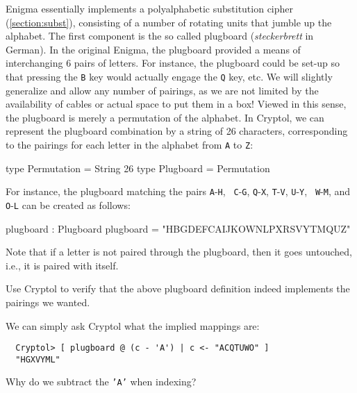 Enigma essentially implements a polyalphabetic substitution cipher
(\autoref{section:subst})\indPolyAlphSubst, consisting of a number
of rotating units that jumble up the alphabet.  The first component is
the so called plugboard ({\em steckerbrett} in
German)\indEnigmaPlugboard. In the original Enigma, the plugboard
provided a means of interchanging 6 pairs of letters. For instance,
the plugboard could be set-up so that pressing the {\tt B} key would
actually engage the {\tt Q} key, etc.  We will slightly generalize and
allow any number of pairings, as we are not limited by the
availability of cables or actual space to put them in a box! Viewed in
this sense, the plugboard is merely a permutation of the alphabet. In
Cryptol, we can represent the plugboard combination by a string of 26
characters, corresponding to the pairings for each letter in the
alphabet from {\tt A} to {\tt Z}:

\begin{code}
  type Permutation = String 26
  type Plugboard = Permutation
\end{code}
For instance, the plugboard matching the pairs {\tt A}-{\tt H}, {\tt
  C}-{\tt G}, {\tt Q}-{\tt X}, {\tt T}-{\tt V}, {\tt U}-{\tt Y}, {\tt
  W}-{\tt M}, and {\tt O}-{\tt L} can be created as follows:
\begin{code}
  plugboard : Plugboard
  plugboard = "HBGDEFCAIJKOWNLPXRSVYTMQUZ"
\end{code}
Note that if a letter is not paired through the plugboard, then it
goes untouched, i.e., it is paired with itself.

\begin{Exercise}\label{ex:enigma:1}
  Use Cryptol to verify that the above plugboard definition indeed
  implements the pairings we wanted.
\end{Exercise}
\begin{Answer}
We can simply ask Cryptol what the implied mappings are:
\begin{Verbatim}
  Cryptol> [ plugboard @ (c - 'A') | c <- "ACQTUWO" ]
  "HGXVYML"
\end{Verbatim}
Why do we subtract the {\tt 'A'} when indexing?
\end{Answer}



